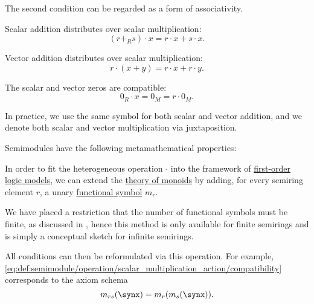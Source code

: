 \begin{definition}
\begin{thmenum}[series=def:semimodule]
\begin{thmenum}
      The second condition can be regarded as a form of associativity.

       Scalar addition distributes over scalar multiplication:
      \begin{equation}\label{eq:def:semimodule/operation/scalar_addition_distributivity}
        (r +_R s) \cdot x = r \cdot x + s \cdot x.
      \end{equation}

       Vector addition distributes over scalar multiplication:
      \begin{equation}\label{eq:def:semimodule/operation/vector_addition_distributivity}
        r \cdot (x + y) = r \cdot x + r \cdot y.
      \end{equation}

       The scalar and vector zeros are compatible:
      \begin{equation}\label{eq:def:semimodule/operation/absorption}
        0_R \cdot x = 0_M = r \cdot 0_M.
      \end{equation}
    \end{thmenum}

    In practice, we use the same symbol for both scalar and vector addition, and we denote both scalar and vector multiplication via juxtaposition.
  \end{thmenum}

  Semimodules have the following metamathematical properties:
  \begin{thmenum}[resume=def:semimodule]
    \mimprovised In order to fit the heterogeneous operation \( \cdot \) into the framework of \hyperref[def:first_order_model]{first-order logic models}, we can extend the \hyperref[def:monoid/theory]{theory of monoids} by adding, for every semiring element \( r \), a unary \hyperref[def:first_order_language/fun]{functional symbol} \( m_r \).

    We have placed a restriction that the number of functional symbols must be finite, as discussed in , hence this method is only available for finite semirings and is simply a conceptual sketch for infinite semirings.

    All conditions can then be reformulated via this operation. For example, \eqref{eq:def:semimodule/operation/scalar_multiplication_action/compatibility} corresponds to the axiom schema
    \begin{equation*}
      m_{rs}(\synx) = m_r(m_s(\synx)).
    \end{equation*}


\end{thmenum}
\end{definition}
